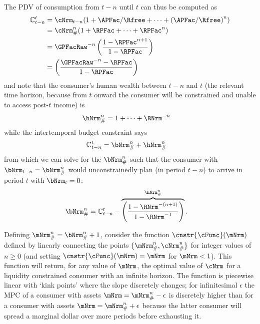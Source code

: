 \documentclass[\econtexRoot/BufferStockTheory]{subfiles}
\begin{document}
The PDV of consumption from $t-n$ until $t$ can thus be computed as
\begin{equation}\begin{gathered}\begin{aligned}
  \mathbb{C}_{t-n}^{t}  & = \cNrm_{t-n}(1+\APFac/\Rfree+ \cdots + {(\APFac/\Rfree)}^{n}) \notag
  \\  & = \cNrm_{\#}^{n}(1+\RPFac+ \cdots + \RPFac^{n}) \notag
  \\  & = \GPFacRaw^{-n}\left(\frac{1-\RPFac^{n+1}}{1-\RPFac}\right) \label{PDVc}
  \\  & = \left(\frac{\GPFacRaw^{-n}-\RPFac}{1-\RPFac}\right) 
\end{aligned}\end{gathered}\end{equation}
and note that the consumer's human wealth between $t-n$ and $t$ (the relevant
time horizon, because from $t$ onward the consumer will be constrained
and unable to access post-$t$ income) is
\begin{equation}\begin{gathered}\begin{aligned}
  \hNrm_{\#}^{n}  & = 1+ \cdots +\RNrm^{-n}
\end{aligned}\end{gathered}\end{equation}
while the intertemporal budget constraint says
\begin{eqnarray*}
  \mathbb{C}_{t-n}^{t}  & = \bNrm_{\#}^{n}+\hNrm_{\#}^{n}
\end{eqnarray*}
from which we can solve for the $\bNrm_{\#}^{n}$ such that
the consumer with $\bNrm_{t-n} = \bNrm_{\#}^{n}$ would
unconstrainedly plan (in period $t-n$) to arrive in period $t$ with
$\bNrm_{t}=0$:
\begin{equation}\begin{gathered}\begin{aligned}
  \bNrm_{\#}^{n} & =  \mathbb{C}_{t-n}^{t} - \overbrace{\left(\frac{1-\RNrm^{-(n+1)}}{1-\RNrm^{-1}}\right)}^{\hNrm_{\#}^{n}} \label{eq:bPound}.
\end{aligned}\end{gathered}\end{equation}

Defining $\mNrm_{\#}^{n}=\bNrm_{\#}^{n}+1$, consider the function
$\cnstr{\cFunc}(\mNrm)$ defined by linearly connecting the points
$\{\mNrm_{\#}^{n},\cNrm_{\#}^{n}\}$ for integer values of $n \geq 0$
(and setting $\cnstr{\cFunc}(\mNrm)=\mNrm$ for $\mNrm<1$).  This
function will return, for any value of $\mNrm$, the optimal value of
$\cNrm$ for a liquidity constrained consumer with an infinite horizon.
The function is piecewise linear with `kink points' where the slope
discretely changes; for infinitesimal $\epsilon$ the MPC of a
consumer with assets $\mNrm=\mNrm_{\#}^{n}-\epsilon$ is discretely
higher than for a consumer with assets $\mNrm=\mNrm_{\#}^{n}+\epsilon$
because the latter consumer will spread a marginal dollar over more
periods before exhausting it.
\end{document}

